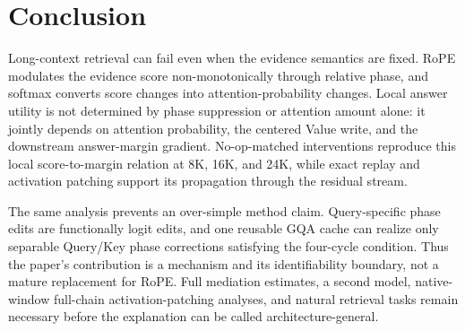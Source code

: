 \section{Conclusion}
\label{sec:conclusion}

Long-context retrieval can fail even when the evidence semantics are fixed.
RoPE modulates the evidence score non-monotonically through relative phase, and
softmax converts score changes into attention-probability changes.  Local
answer utility is not determined by phase suppression or attention amount
alone: it jointly depends on attention probability, the centered Value write,
and the downstream answer-margin gradient.  No-op-matched interventions
reproduce this local score-to-margin relation at 8K, 16K, and 24K, while exact
replay and activation patching support its propagation through the residual
stream.

The same analysis prevents an over-simple method claim.  Query-specific phase
edits are functionally logit edits, and one reusable GQA cache can realize only
separable Query/Key phase corrections satisfying the four-cycle condition.
Thus the paper's contribution is a mechanism and its identifiability boundary,
not a mature replacement for RoPE.  Full mediation estimates, a second model,
native-window full-chain activation-patching analyses, and natural retrieval
tasks remain necessary before the explanation can be called
architecture-general.
